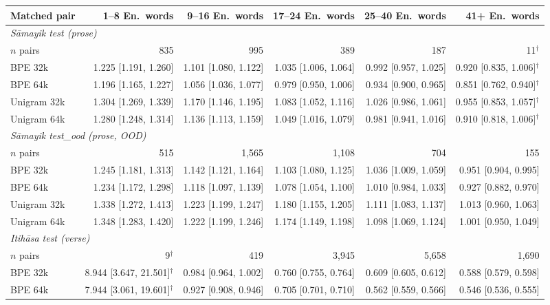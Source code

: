 \begin{table}[t]
\centering
\setlength{\tabcolsep}{3.5pt}
\scriptsize
\begin{tabular}{lrrrrr}
\toprule
Matched pair & 1--8 En.\ words & 9--16 En.\ words & 17--24 En.\ words & 25--40 En.\ words & 41+ En.\ words \\
\midrule
\multicolumn{6}{l}{\emph{S\=amayik test (prose)}} \\
$n$ pairs & 835 & 995 & 389 & 187 & 11$^{\dagger}$ \\
BPE 32k & 1.225 [1.191, 1.260] & 1.101 [1.080, 1.122] & 1.035 [1.006, 1.064] & 0.992 [0.957, 1.025] & 0.920 [0.835, 1.006]$^{\dagger}$ \\
BPE 64k & 1.196 [1.165, 1.227] & 1.056 [1.036, 1.077] & 0.979 [0.950, 1.006] & 0.934 [0.900, 0.965] & 0.851 [0.762, 0.940]$^{\dagger}$ \\
Unigram 32k & 1.304 [1.269, 1.339] & 1.170 [1.146, 1.195] & 1.083 [1.052, 1.116] & 1.026 [0.986, 1.061] & 0.955 [0.853, 1.057]$^{\dagger}$ \\
Unigram 64k & 1.280 [1.248, 1.314] & 1.136 [1.113, 1.159] & 1.049 [1.016, 1.079] & 0.981 [0.941, 1.016] & 0.910 [0.818, 1.006]$^{\dagger}$ \\
\midrule
\multicolumn{6}{l}{\emph{S\=amayik test\_ood (prose, OOD)}} \\
$n$ pairs & 515 & 1,565 & 1,108 & 704 & 155 \\
BPE 32k & 1.245 [1.181, 1.313] & 1.142 [1.121, 1.164] & 1.103 [1.080, 1.125] & 1.036 [1.009, 1.059] & 0.951 [0.904, 0.995] \\
BPE 64k & 1.234 [1.172, 1.298] & 1.118 [1.097, 1.139] & 1.078 [1.054, 1.100] & 1.010 [0.984, 1.033] & 0.927 [0.882, 0.970] \\
Unigram 32k & 1.338 [1.272, 1.413] & 1.223 [1.199, 1.247] & 1.180 [1.155, 1.205] & 1.111 [1.083, 1.137] & 1.013 [0.960, 1.063] \\
Unigram 64k & 1.348 [1.283, 1.420] & 1.222 [1.199, 1.246] & 1.174 [1.149, 1.198] & 1.098 [1.069, 1.124] & 1.001 [0.950, 1.049] \\
\midrule
\multicolumn{6}{l}{\emph{Itih\=asa test (verse)}} \\
$n$ pairs & 9$^{\dagger}$ & 419 & 3,945 & 5,658 & 1,690 \\
BPE 32k & 8.944 [3.647, 21.501]$^{\dagger}$ & 0.984 [0.964, 1.002] & 0.760 [0.755, 0.764] & 0.609 [0.605, 0.612] & 0.588 [0.579, 0.598] \\
BPE 64k & 7.944 [3.061, 19.601]$^{\dagger}$ & 0.927 [0.908, 0.946] & 0.705 [0.701, 0.710] & 0.562 [0.559, 0.566] & 0.546 [0.536, 0.555] \\

\end{tabular}
\end{table}
